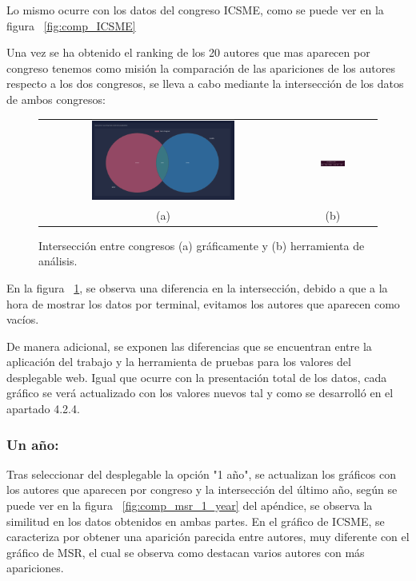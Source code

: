 \documentclass[a4paper, 12pt]{book}
\begin{document}
Lo mismo ocurre con los datos del congreso ICSME, como se puede ver en la figura ~\ref{fig:comp_ICSME}

Una vez se ha obtenido el ranking de los 20 autores que mas aparecen por congreso tenemos como misión la comparación de las apariciones de los autores respecto a los dos congresos, se lleva a cabo mediante la intersección de los datos de ambos congresos:

\begin{figure}[!h]
    \centering
    \begin{tabular}{cc}
    \includegraphics[width=0.595\textwidth]{img/venn_graph_T.png} &  
    \includegraphics[width=0.3\textwidth]{img/inter_all.png} \\
    (a) &(b)
    \end{tabular}
    \caption{Intersección entre congresos (a) gráficamente y (b) herramienta de análisis.}
    \label{fig:comp_inter_all}
\end{figure}

En la figura ~\ref{fig:comp_inter_all}, se observa una diferencia en la intersección, debido a que a la hora de mostrar los datos por terminal, evitamos los autores que aparecen como vacíos.

De manera adicional, se exponen las diferencias que se encuentran entre la aplicación del trabajo y la herramienta de pruebas para los valores del desplegable web. Igual que ocurre con la presentación total de los datos, cada gráfico se verá actualizado con los valores nuevos tal y como se desarrolló en el apartado 4.2.4.

\subsubsection{Un año:}
Tras seleccionar del desplegable la opción "1 año", se actualizan los gráficos con los autores que aparecen por congreso y la intersección del último año, según se puede ver en la figura ~\ref{fig:comp_msr_1_year} del apéndice, se observa la similitud en los datos obtenidos en ambas partes. En el gráfico de ICSME, se caracteriza por obtener una aparición parecida entre autores, muy diferente con el gráfico de MSR, el cual se observa como destacan varios autores con más apariciones.
\end{document}
